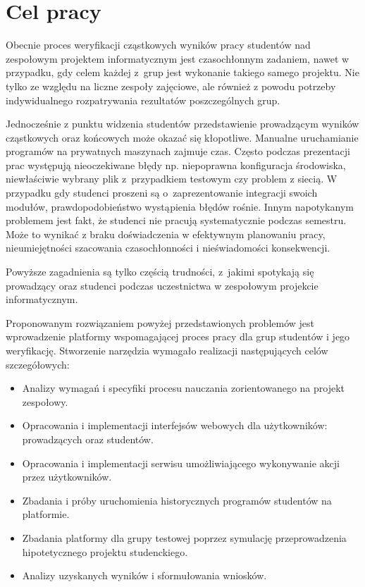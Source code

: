 \chapter{Cel pracy}

Obecnie proces weryfikacji cząstkowych wyników pracy studentów nad zespołowym projektem informatycznym jest czasochłonnym zadaniem, nawet w przypadku, gdy celem każdej z~grup jest wykonanie takiego samego projektu.
Nie tylko ze względu na liczne zespoły zajęciowe, ale również z powodu potrzeby indywidualnego rozpatrywania rezultatów poszczególnych grup.

Jednocześnie z punktu widzenia studentów przedstawienie prowadzącym wyników cząstkowych oraz końcowych może okazać się kłopotliwe.
Manualne uruchamianie programów na prywatnych maszynach zajmuje czas.
Często podczas prezentacji prac występują nieoczekiwane błędy np. niepoprawna konfiguracja środowiska, niewłaściwie wybrany plik z~przypadkiem testowym czy problem z siecią.
W przypadku gdy studenci proszeni są o~zaprezentowanie integracji swoich modułów, prawdopodobieństwo wystąpienia błędów rośnie.
Innym napotykanym problemem jest fakt, że studenci nie pracują systematycznie podczas semestru.
Może to wynikać z braku doświadczenia w efektywnym planowaniu pracy, nieumiejętności szacowania czasochłonności i nieświadomości konsekwencji.

Powyższe zagadnienia są tylko częścią trudności, z~jakimi spotykają się prowadzący oraz studenci podczas uczestnictwa w zespołowym projekcie informatycznym.

Proponowanym rozwiązaniem powyżej przedstawionych problemów jest wprowadzenie platformy wspomagającej proces pracy dla grup studentów i jego weryfikację.
Stworzenie narzędzia wymagało realizacji następujących celów szczegółowych:
\begin{itemize}
    \item Analizy wymagań i specyfiki procesu nauczania zorientowanego na projekt zespołowy.
    \item Opracowania i implementacji interfejsów webowych dla użytkowników: prowadzących oraz studentów.
    \item Opracowania i implementacji serwisu umożliwiającego wykonywanie akcji przez użytkowników.
    \item Zbadania i próby uruchomienia historycznych programów studentów na platformie.
    \item Zbadania platformy dla grupy testowej poprzez symulację przeprowadzenia hipotetycznego projektu studenckiego.
    \item Analizy uzyskanych wyników i sformułowania wniosków.
\end{itemize}

